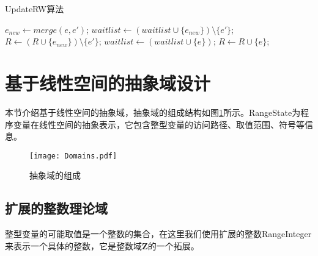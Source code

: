 \begin{breakablealgorithm}
	\caption{UpdateRW算法}
	\label{alg:UpdateRW}
	\begin{algorithmic}[1]
		
				\State $ e_{new}  \gets merge(e, e')$;
					\State $ waitlist \gets (waitlist \cup \{e_{new}\}) \setminus \{e'\} $;
					\State $ R \gets (R \cup \{e_{new}\}) \setminus \{e'\} $;
				\EndIf
			\EndFor
				\State $ waitlist \gets (waitlist \cup \{e\}) $;
				\State $ R \gets R \cup \{e\} $;
			\EndIf
		\EndFunction
		
	\end{algorithmic}
\end{breakablealgorithm}

\section{基于线性空间的抽象域设计}
\label{sec:区间算数抽象域设计}

本节介绍基于线性空间的抽象域，抽象域的组成结构如图\ref{fig:Domains}所示。RangeState为程序变量在线性空间的抽象表示，它包含整型变量的访问路径、取值范围、符号等信息。

\begin{figure}[H]
	\centering
	\texttt{[image: Domains.pdf]}
	\caption{抽象域的组成}
	\label{fig:Domains}
\end{figure}

\subsection{扩展的整数理论域}
\label{sec:Integer}

整型变量的可能取值是一个整数的集合，在这里我们使用扩展的整数RangeInteger来表示一个具体的整数，它是整数域$ \mathbf{Z} $的一个拓展。


